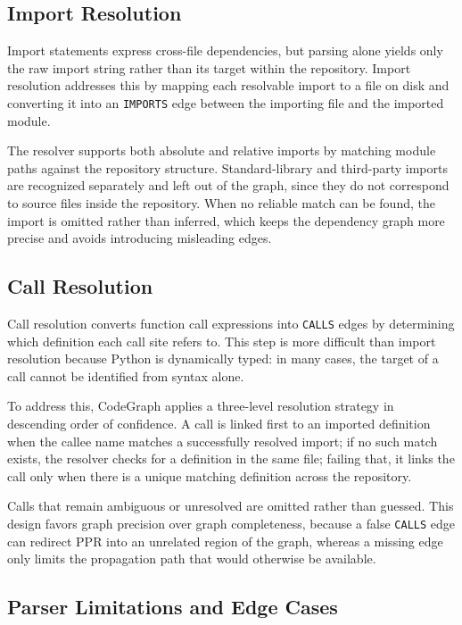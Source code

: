\subsection{Import Resolution}
\label{sec:import-resolution}

Import statements express cross-file dependencies, but parsing alone yields only the raw import string rather than its target within the repository. Import resolution addresses this by mapping each resolvable import to a file on disk and converting it into an \texttt{IMPORTS} edge between the importing file and the imported module.

The resolver supports both absolute and relative imports by matching module paths against the repository structure. Standard-library and third-party imports are recognized separately and left out of the graph, since they do not correspond to source files inside the repository. When no reliable match can be found, the import is omitted rather than inferred, which keeps the dependency graph more precise and avoids introducing misleading edges.

\subsection{Call Resolution}
\label{sec:call-resolution}

Call resolution converts function call expressions into \texttt{CALLS} edges by determining which definition each call site refers to. This step is more difficult than import resolution because Python is dynamically typed: in many cases, the target of a call cannot be identified from syntax alone.

To address this, CodeGraph applies a three-level resolution strategy in descending order of confidence. A call is linked first to an imported definition when the callee name matches a successfully resolved import; if no such match exists, the resolver checks for a definition in the same file; failing that, it links the call only when there is a unique matching definition across the repository.

Calls that remain ambiguous or unresolved are omitted rather than guessed. This design favors graph precision over graph completeness, because a false \texttt{CALLS} edge can redirect PPR into an unrelated region of the graph, whereas a missing edge only limits the propagation path that would otherwise be available.

\subsection{Parser Limitations and Edge Cases}
\label{sec:parser-limitations}

